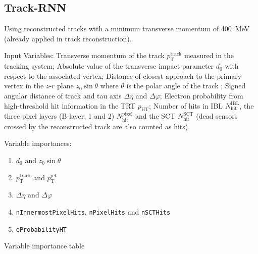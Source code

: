 
\subsection{Track-RNN}
\label{sec:rnn_tracks}



Using reconstructed tracks with a minimum transverse momentum of
\SI{400}{\mega\electronvolt} (already applied in track reconstruction).

Input Variables: Transverse momentum of the track $p_\text{T}^\text{track}$
measured in the tracking system; Absolute value of the transverse impact
parameter $d_0$ with respect to the associated vertex; Distance of closest
approach to the primary vertex in the $z$-$r$ plane $z_0 \sin\theta$ where
$\theta$ is the polar angle of the track ; Signed angular distance of track and tau axis $\Delta \eta$ and
$\Delta \varphi$; Electron probability from high-threshold hit information in
the TRT $p_\text{HT}$; Number of hits in IBL $N_\text{hit}^\text{IBL}$, the
three pixel layers (B-layer, 1 and 2) $N_\text{hit}^\text{pixel}$ and the SCT
$N_\text{hit}^\text{SCT}$ (dead sensors crossed by the reconstructed track are
also counted as hits).

Variable importances:
\begin{enumerate}
\item $d_0$ and $z_0 \sin\theta$
\item $p_\text{T}^\text{track}$ and $p_\text{T}^\text{jet}$
\item $\Delta \eta$ and $\Delta \varphi$
\item \texttt{nInnermostPixelHits}, \texttt{nPixelHits} and \texttt{nSCTHits}
\item \texttt{eProbabilityHT}
\end{enumerate}

\begin{table}[ht]
  \centering
  {\small}
  \caption{Variable importance table}
\end{table}

